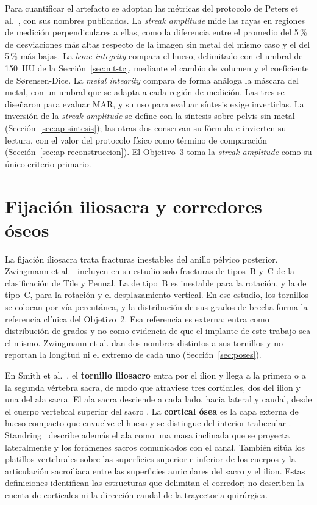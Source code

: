 Para cuantificar el artefacto se adoptan las métricas del protocolo de Peters et al.~\cite{peters2025hybrid}, con sus nombres publicados. La \emph{streak amplitude} mide las rayas en regiones de medición perpendiculares a ellas, como la diferencia entre el promedio del 5\,\% de desviaciones más altas respecto de la imagen sin metal del mismo caso y el del 5\,\% más bajas. La \emph{bone integrity} compara el hueso, delimitado con el umbral de 150~HU de la Sección~\ref{sec:mt-tc}, mediante el cambio de volumen y el coeficiente de Sørensen-Dice. La \emph{metal integrity} compara de forma análoga la máscara del metal, con un umbral que se adapta a cada región de medición. Las tres se diseñaron para evaluar MAR, y su uso para evaluar síntesis exige invertirlas. La inversión de la \emph{streak amplitude} se define con la síntesis sobre pelvis sin metal (Sección~\ref{sec:ap-sintesis}); las otras dos conservan su fórmula e invierten su lectura, con el valor del protocolo físico como término de comparación (Sección~\ref{sec:ap-reconstruccion}). El Objetivo~3 toma la \emph{streak amplitude} como su único criterio primario.

\section{Fijación iliosacra y corredores óseos}\label{sec:mt-iliosacra}

La fijación iliosacra trata fracturas inestables del anillo pélvico posterior. Zwingmann et al.~\cite{zwingmann2009navigated} incluyen en su estudio solo fracturas de tipos~B y~C de la clasificación de Tile y Pennal. La de tipo~B es inestable para la rotación, y la de tipo~C, para la rotación y el desplazamiento vertical. En ese estudio, los tornillos se colocan por vía percutánea, y la distribución de sus grados de brecha forma la referencia clínica del Objetivo~2. Esa referencia es externa: entra como distribución de grados y no como evidencia de que el implante de este trabajo sea el mismo. Zwingmann et al. dan dos nombres distintos a sus tornillos y no reportan la longitud ni el extremo de cada uno (Sección~\ref{sec:poses}).

En Smith et al.~\cite{smith2006iliosacral}, el \textbf{tornillo iliosacro} entra por el ilion y llega a la primera o a la segunda vértebra sacra, de modo que atraviese tres corticales, dos del ilion y una del ala sacra. El ala sacra desciende a cada lado, hacia lateral y caudal, desde el cuerpo vertebral superior del sacro \cite{routt1997}. La \textbf{cortical ósea} es la capa externa de hueso compacto que envuelve el hueso y se distingue del interior trabecular \cite{standring2020grays}. Standring~\cite{standring2020grays} describe además el ala como una masa inclinada que se proyecta lateralmente y los forámenes sacros comunicados con el canal. También sitúa los platillos vertebrales sobre las superficies superior e inferior de los cuerpos y la articulación sacroilíaca entre las superficies auriculares del sacro y el ilion. Estas definiciones identifican las estructuras que delimitan el corredor; no describen la cuenta de corticales ni la dirección caudal de la trayectoria quirúrgica.

